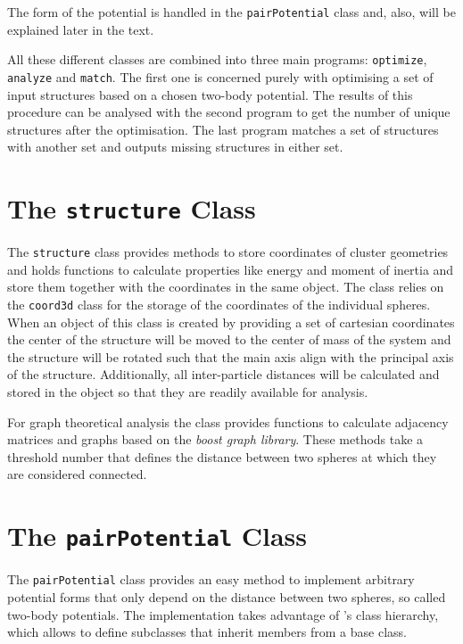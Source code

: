 The form of the potential is handled in the \verb|pairPotential| class and,
also, will be explained later in the text.

All these different classes are combined into three main programs:
\verb|optimize|, \verb|analyze| and \verb|match|. The first one is concerned
purely with optimising a set of input structures based on a chosen two-body
potential. The results of this procedure can be analysed with the second
program to get the number of unique structures after the optimisation. The last
program matches a set of structures with another set and outputs missing
structures in either set.

\section{The \texttt{structure} Class}
\label{sec:thestructureclass}

The \verb|structure| class provides methods to store coordinates of cluster
geometries and holds functions to calculate properties like energy and moment
of inertia and store them together with the coordinates in the same object. The
class relies on the \verb|coord3d| class for the storage of the coordinates of
the individual spheres.  When an object of this class is created by providing a
set of cartesian coordinates the center of the structure will be moved to the
center of mass of the system and the structure will be rotated such that the
main axis align with the principal axis of the structure. Additionally, all
inter-particle distances will be calculated and stored in the object so that
they are readily available for analysis.

For graph theoretical analysis the class provides functions to calculate
adjacency matrices and graphs based on the \textit{boost graph
library}\autocite{_boost_2002}. These methods take a threshold number that
defines the distance between two spheres at which they are considered
connected.

\section{The \texttt{pairPotential} Class}
\label{sec:thepairpotentialclass}

The \texttt{pairPotential} class provides an easy method to implement arbitrary
potential forms that only depend on the distance between two spheres, so called
two-body potentials. The implementation takes advantage of \Cpp's class
hierarchy, which allows to define subclasses that inherit members from a base
class.

